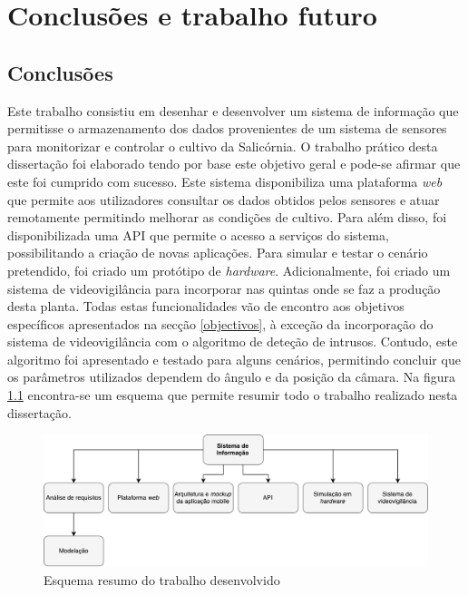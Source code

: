 \chapter{Conclusões e trabalho futuro}


\section{Conclusões}

Este trabalho consistiu em desenhar e desenvolver um sistema de informação que permitisse o armazenamento dos dados provenientes de um sistema de sensores para monitorizar e controlar o cultivo da Salicórnia. O trabalho prático desta dissertação foi elaborado tendo por base este objetivo geral e pode-se afirmar que este foi cumprido com sucesso. Este sistema disponibiliza uma plataforma \textit{web} que permite aos utilizadores consultar os dados obtidos pelos sensores e atuar remotamente permitindo melhorar as condições de cultivo. Para além disso, foi disponibilizada uma \ac{API} que permite o acesso a serviços do sistema, possibilitando a criação de novas aplicações. Para simular e testar o cenário pretendido, foi criado um protótipo de \textit{hardware}. Adicionalmente, foi criado um sistema de videovigilância para incorporar nas quintas onde se faz a produção desta planta. Todas estas funcionalidades vão de encontro aos objetivos específicos apresentados na secção \ref{objectivos}, à exceção da incorporação do sistema de videovigilância com o algoritmo de deteção de intrusos. Contudo, este algoritmo foi apresentado e testado para alguns cenários, permitindo concluir que os parâmetros utilizados dependem do ângulo e da posição da câmara.  Na figura \ref{resumo} encontra-se um esquema que permite resumir todo o trabalho realizado nesta dissertação. 

\begin{figure}[h]
	\centering
	\includegraphics[width=0.68\linewidth]{esquemas/conclusaofinal.pdf}
	\caption{Esquema resumo do trabalho desenvolvido}
	\label{resumo}
\end{figure}

